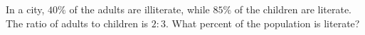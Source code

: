 In a city, $40\%$ of the adults are illiterate, while $85\%$ of the children are literate. The ratio of adults to children is $2:3$. What percent of the population is literate?
